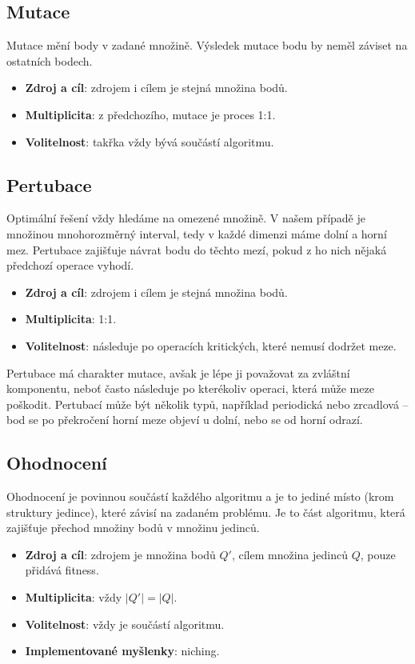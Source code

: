 \subsection{Mutace}

Mutace mění body v zadané množině. Výsledek mutace bodu by neměl záviset na ostatních bodech.
\begin{itemize}
  \item \textbf{Zdroj a cíl}: zdrojem i cílem je stejná množina bodů.
  \item \textbf{Multiplicita}: z předchozího, mutace je proces 1:1.
  \item \textbf{Volitelnost}: takřka vždy bývá součástí algoritmu.
\end{itemize}

\subsection{Pertubace }

Optimální řešení vždy hledáme na omezené množině. V našem případě je množinou mnohorozměrný interval, tedy v každé dimenzi máme dolní a horní mez. Pertubace zajišťuje návrat bodu do těchto mezí, pokud z ho nich nějaká předchozí operace vyhodí.
\begin{itemize}
  \item \textbf{Zdroj a cíl}: zdrojem i cílem je stejná množina bodů.
  \item \textbf{Multiplicita}:  1:1.
  \item \textbf{Volitelnost}: následuje po operacích kritických, které nemusí dodržet meze.
\end{itemize}

Pertubace má charakter mutace, avšak je lépe ji považovat za zvláštní komponentu, neboť často následuje po kterékoliv operaci, která může meze poškodit. Pertubací může být několik typů, například periodická nebo zrcadlová -- bod se po překročení horní meze objeví u dolní, nebo se od horní odrazí.


\subsection{Ohodnocení}

Ohodnocení je povinnou součástí každého algoritmu a je to jediné místo (krom struktury jedince), které závisí na zadaném problému. Je to část algoritmu, která zajišťuje přechod množiny bodů v množinu jedinců.
\begin{itemize}
  \item \textbf{Zdroj a cíl}: zdrojem je množina bodů $Q'$, cílem množina jedinců $Q$, pouze přidává fitness.
  \item \textbf{Multiplicita}: vždy $|Q'| = |Q|$.
  \item \textbf{Volitelnost}: vždy je součástí algoritmu.
  \item \textbf{Implementované myšlenky}: niching.
\end{itemize}


